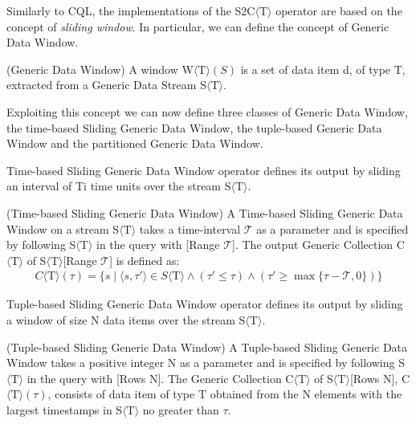 Similarly to CQL, the implementations of the S2C$\langle\mathrm{T}\rangle$ operator are based on the concept of \textit{sliding window}.
In particular, we can define the concept of Generic Data Window.

\begin{Definition}
(Generic Data Window) A window W$\langle\mathrm{T}\rangle(S)$ is a set of data item d, of type $\mathrm{T}$, extracted from a Generic Data Stream S$\langle\mathrm{T}\rangle$. 
\end{Definition}

Exploiting this concept we can now define three classes of Generic Data Window, the time-based Sliding Generic Data Window, the tuple-based Generic Data Window and the partitioned Generic Data Window.

Time-based Sliding Generic Data Window operator defines its output by sliding an interval of Ti time units over the stream S$\langle\mathrm{T}\rangle$.

\begin{Definition}
(Time-based Sliding Generic Data Window) A Time-based Sliding Generic Data Window on a stream S$\langle\mathrm{T}\rangle$ takes a time-interval $\mathcal{T}$ as a parameter and is specified by following S$\langle\mathrm{T}\rangle$ in the query with [Range $\mathcal{T}$].
The output Generic Collection C$\langle\mathrm{T}\rangle$ of S$\langle\mathrm{T}\rangle$[Range $\mathcal{T}$] is defined as:
\noindent\begin{align*}
C\langle\mathrm{T}\rangle(\tau)=\{s \mid \langle s,\tau' \rangle \in S\langle\mathrm{T}\rangle \wedge (\tau' \leq \tau) \wedge (\tau' \geq \max\{\tau - \mathcal{T},0\})\}
\end{align*}  
\end{Definition}

Tuple-based Sliding Generic Data Window operator defines its output by sliding a window of size N data items over the stream S$\langle\mathrm{T}\rangle$.
\begin{Definition}
(Tuple-based Sliding Generic Data Window) A Tuple-based Sliding Generic Data Window takes a positive integer N as a parameter and is specified by following S$\langle\mathrm{T}\rangle$ in the query with [Rows N].
The Generic Collection C$\langle\mathrm{T}\rangle$ of S$\langle\mathrm{T}\rangle$[Rows N], C$\langle\mathrm{T}\rangle(\tau)$, consists of data item of type $\mathrm{T}$ obtained from the N elements with the largest timestamps in S$\langle\mathrm{T}\rangle$ no greater than $\tau$.
\end{Definition}

